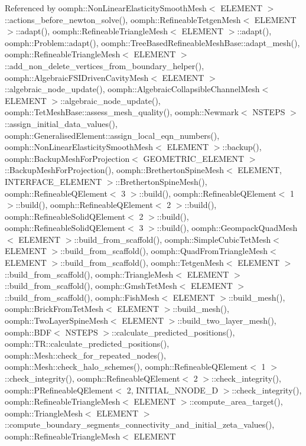 Referenced by oomph\+::\+Non\+Linear\+Elasticity\+Smooth\+Mesh$<$ E\+L\+E\+M\+E\+N\+T $>$\+::actions\+\_\+before\+\_\+newton\+\_\+solve(), oomph\+::\+Refineable\+Tetgen\+Mesh$<$ E\+L\+E\+M\+E\+N\+T $>$\+::adapt(), oomph\+::\+Refineable\+Triangle\+Mesh$<$ E\+L\+E\+M\+E\+N\+T $>$\+::adapt(), oomph\+::\+Problem\+::adapt(), oomph\+::\+Tree\+Based\+Refineable\+Mesh\+Base\+::adapt\+\_\+mesh(), oomph\+::\+Refineable\+Triangle\+Mesh$<$ E\+L\+E\+M\+E\+N\+T $>$\+::add\+\_\+non\+\_\+delete\+\_\+vertices\+\_\+from\+\_\+boundary\+\_\+helper(), oomph\+::\+Algebraic\+F\+S\+I\+Driven\+Cavity\+Mesh$<$ E\+L\+E\+M\+E\+N\+T $>$\+::algebraic\+\_\+node\+\_\+update(), oomph\+::\+Algebraic\+Collapsible\+Channel\+Mesh$<$ E\+L\+E\+M\+E\+N\+T $>$\+::algebraic\+\_\+node\+\_\+update(), oomph\+::\+Tet\+Mesh\+Base\+::assess\+\_\+mesh\+\_\+quality(), oomph\+::\+Newmark$<$ N\+S\+T\+E\+P\+S $>$\+::assign\+\_\+initial\+\_\+data\+\_\+values(), oomph\+::\+Generalised\+Element\+::assign\+\_\+local\+\_\+eqn\+\_\+numbers(), oomph\+::\+Non\+Linear\+Elasticity\+Smooth\+Mesh$<$ E\+L\+E\+M\+E\+N\+T $>$\+::backup(), oomph\+::\+Backup\+Mesh\+For\+Projection$<$ G\+E\+O\+M\+E\+T\+R\+I\+C\+\_\+\+E\+L\+E\+M\+E\+N\+T $>$\+::\+Backup\+Mesh\+For\+Projection(), oomph\+::\+Bretherton\+Spine\+Mesh$<$ E\+L\+E\+M\+E\+N\+T, I\+N\+T\+E\+R\+F\+A\+C\+E\+\_\+\+E\+L\+E\+M\+E\+N\+T $>$\+::\+Bretherton\+Spine\+Mesh(), oomph\+::\+Refineable\+Q\+Element$<$ 3 $>$\+::build(), oomph\+::\+Refineable\+Q\+Element$<$ 1 $>$\+::build(), oomph\+::\+Refineable\+Q\+Element$<$ 2 $>$\+::build(), oomph\+::\+Refineable\+Solid\+Q\+Element$<$ 2 $>$\+::build(), oomph\+::\+Refineable\+Solid\+Q\+Element$<$ 3 $>$\+::build(), oomph\+::\+Geompack\+Quad\+Mesh$<$ E\+L\+E\+M\+E\+N\+T $>$\+::build\+\_\+from\+\_\+scaffold(), oomph\+::\+Simple\+Cubic\+Tet\+Mesh$<$ E\+L\+E\+M\+E\+N\+T $>$\+::build\+\_\+from\+\_\+scaffold(), oomph\+::\+Quad\+From\+Triangle\+Mesh$<$ E\+L\+E\+M\+E\+N\+T $>$\+::build\+\_\+from\+\_\+scaffold(), oomph\+::\+Tetgen\+Mesh$<$ E\+L\+E\+M\+E\+N\+T $>$\+::build\+\_\+from\+\_\+scaffold(), oomph\+::\+Triangle\+Mesh$<$ E\+L\+E\+M\+E\+N\+T $>$\+::build\+\_\+from\+\_\+scaffold(), oomph\+::\+Gmsh\+Tet\+Mesh$<$ E\+L\+E\+M\+E\+N\+T $>$\+::build\+\_\+from\+\_\+scaffold(), oomph\+::\+Fish\+Mesh$<$ E\+L\+E\+M\+E\+N\+T $>$\+::build\+\_\+mesh(), oomph\+::\+Brick\+From\+Tet\+Mesh$<$ E\+L\+E\+M\+E\+N\+T $>$\+::build\+\_\+mesh(), oomph\+::\+Two\+Layer\+Spine\+Mesh$<$ E\+L\+E\+M\+E\+N\+T $>$\+::build\+\_\+two\+\_\+layer\+\_\+mesh(), oomph\+::\+B\+D\+F$<$ N\+S\+T\+E\+P\+S $>$\+::calculate\+\_\+predicted\+\_\+positions(), oomph\+::\+T\+R\+::calculate\+\_\+predicted\+\_\+positions(), oomph\+::\+Mesh\+::check\+\_\+for\+\_\+repeated\+\_\+nodes(), oomph\+::\+Mesh\+::check\+\_\+halo\+\_\+schemes(), oomph\+::\+Refineable\+Q\+Element$<$ 1 $>$\+::check\+\_\+integrity(), oomph\+::\+Refineable\+Q\+Element$<$ 2 $>$\+::check\+\_\+integrity(), oomph\+::\+P\+Refineable\+Q\+Element$<$ 2, I\+N\+I\+T\+I\+A\+L\+\_\+\+N\+N\+O\+D\+E\+\_\+D $>$\+::check\+\_\+integrity(), oomph\+::\+Refineable\+Triangle\+Mesh$<$ E\+L\+E\+M\+E\+N\+T $>$\+::compute\+\_\+area\+\_\+target(), oomph\+::\+Triangle\+Mesh$<$ E\+L\+E\+M\+E\+N\+T $>$\+::compute\+\_\+boundary\+\_\+segments\+\_\+connectivity\+\_\+and\+\_\+initial\+\_\+zeta\+\_\+values(), oomph\+::\+Refineable\+Triangle\+Mesh$<$ E\+L\+E\+M\+E\+N\+T 